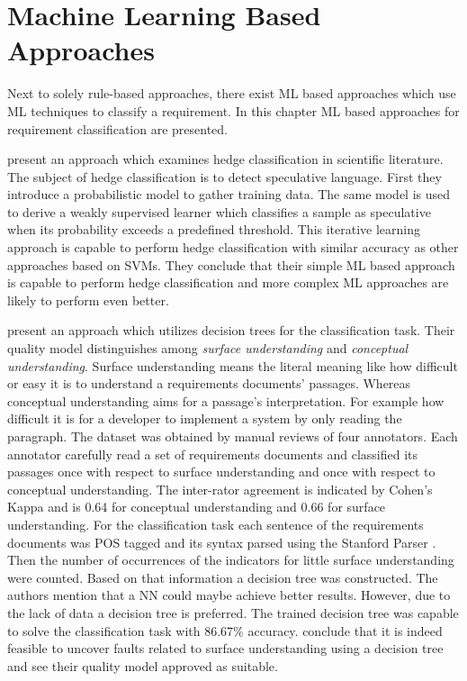 \section{Machine Learning Based Approaches}
\label{chp:related_research:sec:machine_learingn_based_approaches}

Next to solely rule-based approaches, there exist \ac{ML} based approaches which use \ac{ML} techniques to classify a requirement.
In this chapter \ac{ML} based approaches for requirement classification are presented.

\textcite{Medlock:2007} present an approach which examines hedge classification in scientific literature.
The subject of hedge classification is to detect speculative language.
First they introduce a probabilistic model to gather training data.
The same model is used to derive a weakly supervised learner which classifies a sample as speculative when its probability exceeds a predefined threshold.
This iterative learning approach is capable to perform hedge classification with similar accuracy as other approaches based on \acp{SVM}.
They conclude that their simple \ac{ML} based approach is capable to perform hedge classification and more complex \ac{ML} approaches are likely to perform even better.

\textcite{Ormandjieva:2007} present an approach which utilizes decision trees for the classification task.
Their quality model distinguishes among \textit{surface understanding} and \textit{conceptual understanding}.
Surface understanding means the literal meaning like how difficult or easy it is to understand a requirements documents' passages.
Whereas conceptual understanding aims for a passage's interpretation.
For example how difficult it is for a developer to implement a system by only reading the paragraph.
The dataset was obtained by manual reviews of four annotators.
Each annotator carefully read a set of requirements documents and classified its passages once with respect to surface understanding and once with respect to conceptual understanding.
The inter-rator agreement is indicated by Cohen's Kappa \parencite{Cohen:1960} and is 0.64 for conceptual understanding and 0.66 for surface understanding.
For the classification task each sentence of the requirements documents was \ac{POS} tagged and its syntax parsed using the Stanford Parser \parencite{Klein:2002}.
Then the number of occurrences of the indicators for little surface understanding were counted.
Based on that information a decision tree was constructed.
The authors mention that a \ac{NN} could maybe achieve better results.
However, due to the lack of data a decision tree is preferred.
The trained decision tree was capable to solve the classification task with 86.67\% accuracy.
\textcite{Ormandjieva:2007} conclude that it is indeed feasible to uncover faults related to surface understanding using a decision tree and see their quality model approved as suitable.


